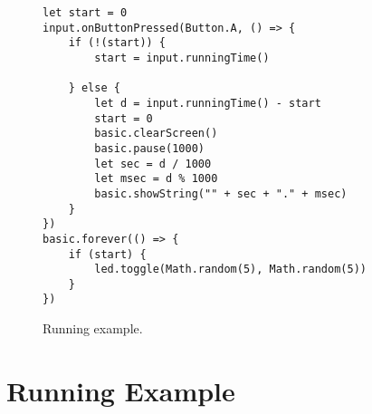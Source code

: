 
\begin{figure}
\begin{lstlisting}
let start = 0
input.onButtonPressed(Button.A, () => {
    if (!(start)) {
        start = input.runningTime()

    } else {
        let d = input.runningTime() - start
        start = 0
        basic.clearScreen()
        basic.pause(1000)
        let sec = d / 1000
        let msec = d % 1000
        basic.showString("" + sec + "." + msec)
    }
})
basic.forever(() => {
    if (start) {
        led.toggle(Math.random(5), Math.random(5))
    }
})
\end{lstlisting}
\caption{\label{fig:running}Running example.}
\end{figure}

\section{Running Example}